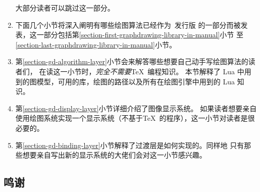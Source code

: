 \begin{enumerate}
大部分读者可以跳过这一部分。
\item 下面几个小节将深入阐明有哪些绘图算法已经作为\tikzname\ 发行版
的一部分而被发表，这一部分包括第\ref{section-first-graphdrawing-library-in-manual}小节
至\ref{section-last-graphdrawing-library-in-manual}小节。
\item
第\ref{section-gd-algorithm-layer}小节会来解答哪些想要自己动手写绘图算法的读者们，
在读这一小节时，\emph{完全不需要}\TeX\ 编程知识。
本节解释了 Lua 中用到的图模型，可用的库，绘图的路径以及所有在绘图引擎中用到的
Lua 知识。
\item
第\ref{section-gd-display-layer}小节详细介绍了图像显示系统。
如果读者想要亲自使用绘图系统实现一个显示系统（不基于\TeX\ 的程序），这一小节对读者是很必要的。
\item
第\ref{section-gd-binding-layer}小节解释了过渡层是如何实现的。同样地
只有那些想要亲自写出新的显示系统的大佬们会对这一小节感兴趣。
\end{enumerate}



\subsection{鸣谢}

